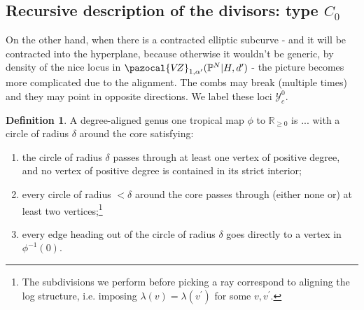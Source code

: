 \documentclass[11pt]{amsart}
\newcommand{\PP}{\mathbb P}
\newcommand{\VZ}{\pazocal{V\!Z}}
\theoremstyle{definition}
\theoremstyle{definition}
\newtheorem{dfn}[thm]{Definition}
\begin{document}
\subsection{Recursive description of the divisors: type $C_0$}
On the other hand, when there is a contracted elliptic subcurve - and it will be contracted into the hyperplane, because otherwise it wouldn't be generic, by density of the nice locus in $\VZ_{1,\alpha^\prime}(\PP^N|H,d^\prime)$ - the picture becomes more complicated due to the alignment. The combs may break (multiple times) and they may point in opposite directions. We label these loci $\mathcal{Y}_c^0$.
\begin{figure}
\end{figure}
\begin{dfn}
 A degree-aligned genus one tropical map $\phi$ to $\mathbb R_{\geq 0}$ is ... with a circle of radius $\delta$ around the core satisfying:
 \begin{enumerate}
  \item the circle of radius $\delta$ passes through at least one vertex of positive degree, and no vertex of positive degree is contained in its strict interior;
  \item every circle of radius $<\delta$ around the core passes through (either none or) at least two vertices;\footnote{The subdivisions we perform before picking a ray correspond to aligning the log structure, i.e. imposing $\lambda(v)=\lambda(v^\prime)$ for some $v,v^\prime$.}
  \item every edge heading out of the circle of radius $\delta$ goes directly to a vertex in $\phi^{-1}(0)$.
 \end{enumerate}
\end{dfn}
\end{document}
